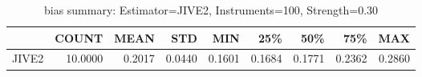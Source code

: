 \begin{table}[ht]
\centering
\caption{bias summary: Estimator=JIVE2, Instruments=100, Strength=0.30}
\begin{tabular}{lrrrrrrrr}
\toprule
 & COUNT & MEAN & STD & MIN & 25\% & 50\% & 75\% & MAX \\
\midrule
JIVE2 & 10.0000 & 0.2017 & 0.0440 & 0.1601 & 0.1684 & 0.1771 & 0.2362 & 0.2860 \\
\bottomrule
\end{tabular}
\end{table}
